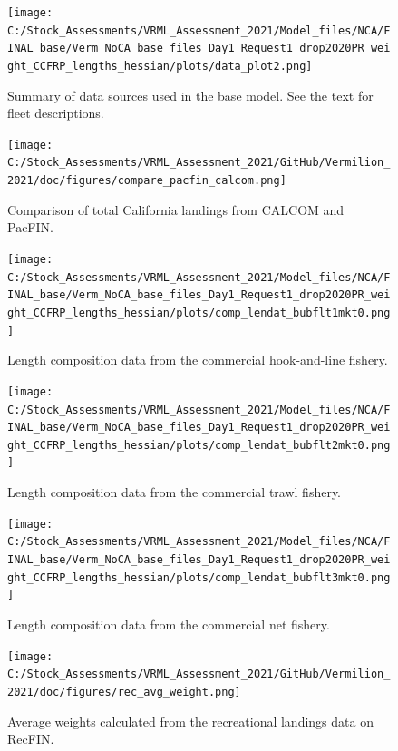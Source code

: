 \documentclass[
  english,
  a4paper,
]{article}
\begin{document}
\begin{figure}
\centering
\texttt{[image: C:/Stock\_Assessments/VRML\_Assessment\_2021/Model\_files/NCA/FINAL\_base/Verm\_NoCA\_base\_files\_Day1\_Request1\_drop2020PR\_weight\_CCFRP\_lengths\_hessian/plots/data\_plot2.png]}
\caption{Summary of data sources used in the base model. See the text for fleet descriptions.\label{fig:data-plot}}
\end{figure}

\begin{figure}
\centering
\texttt{[image: C:/Stock\_Assessments/VRML\_Assessment\_2021/GitHub/Vermilion\_2021/doc/figures/compare\_pacfin\_calcom.png]}
\caption{Comparison of total California landings from CALCOM and PacFIN.\label{fig:calcom-pacfin}}
\end{figure}

\FloatBarrier

\FloatBarrier

\begin{figure}
\centering
\texttt{[image: C:/Stock\_Assessments/VRML\_Assessment\_2021/Model\_files/NCA/FINAL\_base/Verm\_NoCA\_base\_files\_Day1\_Request1\_drop2020PR\_weight\_CCFRP\_lengths\_hessian/plots/comp\_lendat\_bubflt1mkt0.png]}
\caption{Length composition data from the commercial hook-and-line fishery.\label{fig:len-data-COM-HKL}}
\end{figure}

\begin{figure}
\centering
\texttt{[image: C:/Stock\_Assessments/VRML\_Assessment\_2021/Model\_files/NCA/FINAL\_base/Verm\_NoCA\_base\_files\_Day1\_Request1\_drop2020PR\_weight\_CCFRP\_lengths\_hessian/plots/comp\_lendat\_bubflt2mkt0.png]}
\caption{Length composition data from the commercial trawl fishery.\label{fig:len-data-COM-TWL}}
\end{figure}

\begin{figure}
\centering
\texttt{[image: C:/Stock\_Assessments/VRML\_Assessment\_2021/Model\_files/NCA/FINAL\_base/Verm\_NoCA\_base\_files\_Day1\_Request1\_drop2020PR\_weight\_CCFRP\_lengths\_hessian/plots/comp\_lendat\_bubflt3mkt0.png]}
\caption{Length composition data from the commercial net fishery.\label{fig:len-data-COM-NET}}
\end{figure}

\begin{figure}
\centering
\texttt{[image: C:/Stock\_Assessments/VRML\_Assessment\_2021/GitHub/Vermilion\_2021/doc/figures/rec\_avg\_weight.png]}
\caption{Average weights calculated from the recreational landings data on RecFIN.\label{fig:rec-avg-weights}}
\end{figure}
\end{document}
